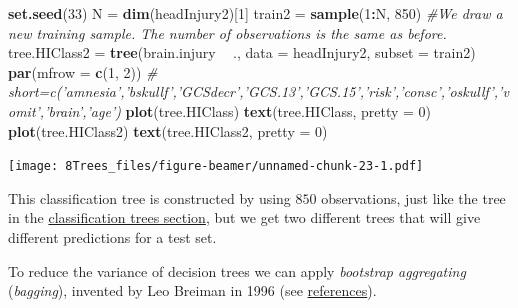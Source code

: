 \documentclass[10pt,ignorenonframetext,]{beamer}
\newenvironment{Shaded}{\begin{snugshade}}{\end{snugshade}}
\newcommand{\KeywordTok}[1]{\textcolor[rgb]{0.13,0.29,0.53}{\textbf{#1}}}
\newcommand{\DataTypeTok}[1]{\textcolor[rgb]{0.13,0.29,0.53}{#1}}
\newcommand{\DecValTok}[1]{\textcolor[rgb]{0.00,0.00,0.81}{#1}}
\newcommand{\StringTok}[1]{\textcolor[rgb]{0.31,0.60,0.02}{#1}}
\newcommand{\CommentTok}[1]{\textcolor[rgb]{0.56,0.35,0.01}{\textit{#1}}}
\newcommand{\OperatorTok}[1]{\textcolor[rgb]{0.81,0.36,0.00}{\textbf{#1}}}
\newcommand{\NormalTok}[1]{#1}
\begin{document}
\begin{frame}[fragile]

\begin{Shaded}
\begin{Highlighting}[]
\KeywordTok{set.seed}\NormalTok{(}\DecValTok{33}\NormalTok{)}
\NormalTok{N =}\StringTok{ }\KeywordTok{dim}\NormalTok{(headInjury2)[}\DecValTok{1}\NormalTok{]}
\NormalTok{train2 =}\StringTok{ }\KeywordTok{sample}\NormalTok{(}\DecValTok{1}\OperatorTok{:}\NormalTok{N, }\DecValTok{850}\NormalTok{)  }\CommentTok{#We draw a new training sample. The number of observations is the same as before.}
\NormalTok{tree.HIClass2 =}\StringTok{ }\KeywordTok{tree}\NormalTok{(brain.injury }\OperatorTok{~}\StringTok{ }\NormalTok{., }\DataTypeTok{data =}\NormalTok{ headInjury2, }\DataTypeTok{subset =}\NormalTok{ train2)}
\KeywordTok{par}\NormalTok{(}\DataTypeTok{mfrow =} \KeywordTok{c}\NormalTok{(}\DecValTok{1}\NormalTok{, }\DecValTok{2}\NormalTok{))}
\CommentTok{# short=c('amnesia','bskullf','GCSdecr','GCS.13','GCS.15','risk','consc','oskullf','vomit','brain','age')}
\KeywordTok{plot}\NormalTok{(tree.HIClass)}
\KeywordTok{text}\NormalTok{(tree.HIClass, }\DataTypeTok{pretty =} \DecValTok{0}\NormalTok{)}
\KeywordTok{plot}\NormalTok{(tree.HIClass2)}
\KeywordTok{text}\NormalTok{(tree.HIClass2, }\DataTypeTok{pretty =} \DecValTok{0}\NormalTok{)}
\end{Highlighting}
\end{Shaded}

\texttt{[image: 8Trees\_files/figure-beamer/unnamed-chunk-23-1.pdf]}

\end{frame}

\begin{frame}

This classification tree is constructed by using \(850\) observations,
just like the tree in the \href{classtree2}{classification trees
section}, but we get two different trees that will give different
predictions for a test set.

To reduce the variance of decision trees we can apply \emph{bootstrap
aggregating} (\emph{bagging}), invented by Leo Breiman in 1996 (see
\href{ref}{references}).

\end{frame}
\end{document}
